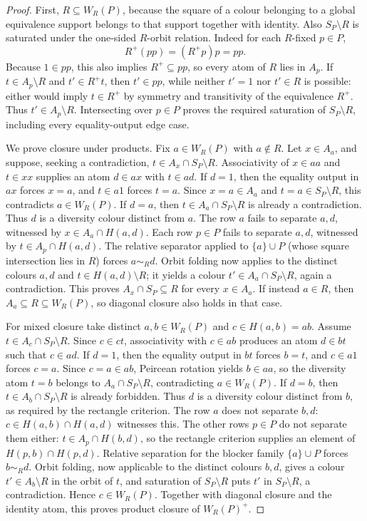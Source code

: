 \begin{proof}
First, $R\subseteq W_R(P)$, because the square of a colour belonging
to a global equivalence support belongs to that support together with
identity. Also $S_P\setminus R$ is saturated under the one-sided
$R$-orbit relation. Indeed for each $R$-fixed $p\in P$,
\[
 R^+(pp)=(R^+p)p=pp.
\]
Because $1\in pp$, this also implies $R^+\subseteq pp$,
so every atom of $R$ lies in $A_p$. If $t\in A_p\setminus R$
and $t'\in R^+t$, then $t'\in pp$, while neither $t'=1$
nor $t'\in R$ is possible: either would imply $t\in R^+$
by symmetry and transitivity of the equivalence $R^+$.
Thus $t'\in A_p\setminus R$. Intersecting over $p\in P$
proves the required saturation of $S_P\setminus R$,
including every equality-output edge case.

We prove closure under products. Fix $a\in W_R(P)$ with $a\notin R$.
Let $x\in A_a$, and suppose, seeking a contradiction,
$t\in A_x\cap S_P\setminus R$. Associativity of $x\in aa$ and
$t\in xx$ supplies an atom $d\in ax$ with $t\in ad$.
If $d=1$, then the equality output in $ax$ forces $x=a$,
and $t\in a1$ forces $t=a$.  Since $x=a\in A_a$ and
$t=a\in S_P\setminus R$, this contradicts $a\in W_R(P)$.
If $d=a$, then $t\in A_a\cap S_P\setminus R$ is already a
contradiction. Thus $d$ is a diversity colour distinct from $a$.
The row $a$ fails to separate $a,d$, witnessed by
$x\in A_a\cap H(a,d)$. Each row $p\in P$ fails to separate
$a,d$, witnessed by $t\in A_p\cap H(a,d)$. The relative
separator applied to $\{a\}\cup P$ (whose square intersection
lies in $R$) forces $a\sim_R d$. Orbit folding now applies to
the distinct colours $a,d$ and $t\in H(a,d)\setminus R$;
it yields a colour $t'\in A_a\cap S_P\setminus R$, again a
contradiction.
This proves $A_x\cap S_P\subseteq R$ for every $x\in A_a$.
If instead $a\in R$, then $A_a\subseteq R\subseteq W_R(P)$,
so diagonal closure also holds in that case.

For mixed closure take distinct $a,b\in W_R(P)$ and
$c\in H(a,b)=ab$. Assume $t\in A_c\cap S_P\setminus R$.
Since $c\in ct$, associativity with $c\in ab$ produces an atom
$d\in bt$ such that $c\in ad$. If $d=1$, then the equality
output in $bt$ forces $b=t$, and $c\in a1$ forces $c=a$.
Since $c=a\in ab$, Peircean rotation yields
$b\in aa$, so the diversity atom $t=b$
belongs to $A_a\cap S_P\setminus R$, contradicting
$a\in W_R(P)$. If $d=b$, then $t\in A_b\cap S_P\setminus R$
is already forbidden. Thus $d$ is a diversity colour distinct
from $b$, as required by the rectangle criterion. The row $a$
does not separate $b,d$: $c\in H(a,b)\cap H(a,d)$ witnesses
this. The other rows $p\in P$ do not separate them either:
$t\in A_p\cap H(b,d)$, so the rectangle criterion supplies an
element of $H(p,b)\cap H(p,d)$. Relative separation for the
blocker family $\{a\}\cup P$ forces $b\sim_R d$. Orbit folding,
now applicable to the distinct colours $b,d$, gives a colour
$t'\in A_b\setminus R$ in the orbit of $t$, and saturation of
$S_P\setminus R$ puts $t'$ in $S_P\setminus R$, a contradiction.
Hence $c\in W_R(P)$. Together with diagonal closure and the
identity atom, this proves product closure of $W_R(P)^+$.
\end{proof}

